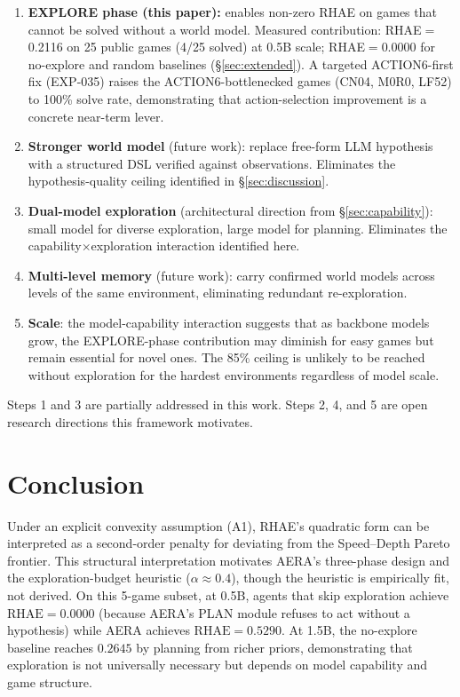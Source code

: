 \documentclass[11pt]{article}
\begin{document}
\begin{enumerate}[leftmargin=*]
\item \textbf{EXPLORE phase (this paper):} enables non-zero RHAE on games that cannot be solved without a world model. Measured contribution: RHAE$=$0.2116 on 25 public games (4/25 solved) at 0.5B scale; RHAE$=$0.0000 for no-explore and random baselines (\S\ref{sec:extended}). A targeted ACTION6-first fix (EXP-035) raises the ACTION6-bottlenecked games (CN04, M0R0, LF52) to 100\% solve rate, demonstrating that action-selection improvement is a concrete near-term lever.
\item \textbf{Stronger world model} (future work): replace free-form LLM hypothesis with a structured DSL verified against observations. Eliminates the hypothesis-quality ceiling identified in \S\ref{sec:discussion}.
\item \textbf{Dual-model exploration} (architectural direction from \S\ref{sec:capability}): small model for diverse exploration, large model for planning. Eliminates the capability$\times$exploration interaction identified here.
\item \textbf{Multi-level memory} (future work): carry confirmed world models across levels of the same environment, eliminating redundant re-exploration.
\item \textbf{Scale}: the model-capability interaction suggests that as backbone models grow, the EXPLORE-phase contribution may diminish for easy games but remain essential for novel ones. The 85\% ceiling is unlikely to be reached without exploration for the hardest environments regardless of model scale.
\end{enumerate}

Steps 1 and 3 are partially addressed in this work. Steps 2, 4, and 5 are open research directions this framework motivates.

\section{Conclusion}

Under an explicit convexity assumption (A1), RHAE's quadratic form can be interpreted as a second-order penalty for deviating from the Speed--Depth Pareto frontier. This structural interpretation motivates AERA's three-phase design and the exploration-budget heuristic ($\alpha \approx 0.4$), though the heuristic is empirically fit, not derived. On this 5-game subset, at 0.5B, agents that skip exploration achieve $\text{RHAE}{=}0.0000$ (because AERA's PLAN module refuses to act without a hypothesis) while AERA achieves $\text{RHAE}{=}0.5290$. At 1.5B, the no-explore baseline reaches $0.2645$ by planning from richer priors, demonstrating that exploration is not universally necessary but depends on model capability and game structure.
\end{document}
